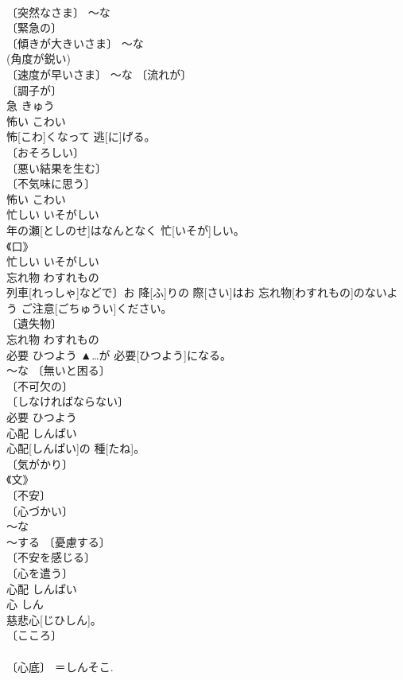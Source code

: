 \documentclass[8pt]{extreport}
\begin{document}
\begin{CJK}{UTF8}{min}
\\	〔突然なさま〕 ～な 
\\	〔緊急の〕 
\\	〔傾きが大きいさま〕 ～な 
\\	(角度が鋭い) 
\\	〔速度が早いさま〕 ～な 〔流れが〕 
\\	〔調子が〕 
\\	急	きゅう	
\\	怖い	こわい	
\\	怖[こわ]くなって 逃[に]げる。	
\\	〔おそろしい〕 
\\	〔悪い結果を生む〕 
\\	〔不気味に思う〕 
\\	怖い	こわい	
\\	忙しい	いそがしい	
\\	年の瀬[としのせ]はなんとなく 忙[いそが]しい。	
\\	《口》 
\\	忙しい	いそがしい	
\\	忘れ物	わすれもの	
\\	列車[れっしゃ]などで〕お 降[ふ]りの 際[さい]はお 忘れ物[わすれもの]のないよう ご注意[ごちゅうい]ください。	
\\	〔遺失物〕 
\\	忘れ物	わすれもの	
\\	必要	ひつよう	▲…が 必要[ひつよう]になる。	
\\	～な 〔無いと困る〕 
\\	〔不可欠の〕 
\\	〔しなければならない〕 
\\	必要	ひつよう	
\\	心配	しんぱい	
\\	心配[しんぱい]の 種[たね]。	
\\	〔気がかり〕 
\\	《文》 
\\	〔不安〕 
\\	〔心づかい〕 
\\	～な 
\\	～する 〔憂慮する〕 
\\	〔不安を感じる〕 
\\	〔心を遣う〕 
\\	心配	しんぱい	
\\	心	しん	
\\	慈悲心[じひしん]。	
\\	〔こころ〕 
\\	[＝こころ] 
\\	〔心底〕 ＝しんそこ. 

\end{CJK}
\end{document}
